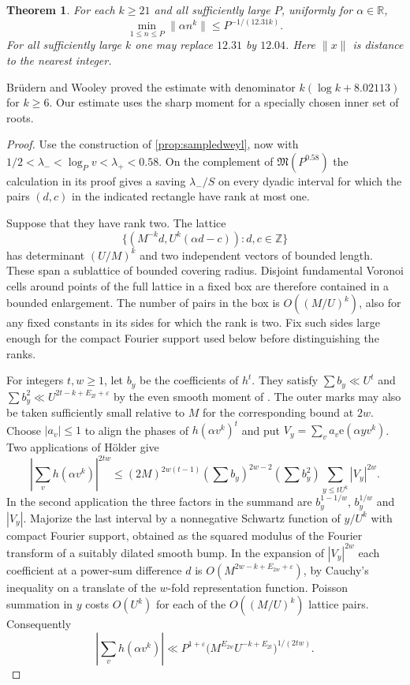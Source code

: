 \documentclass[11pt,letterpaper]{article}
\newtheorem{theorem}{Theorem}[section]
\theoremstyle{definition}
\newcommand{\Z}{\mathbb Z}
\newcommand{\R}{\mathbb R}
\newcommand{\M}{\mathfrak M}
\newcommand{\e}{\mathrm e}
\newcommand{\eps}{\varepsilon}
\begin{document}
\begin{theorem}\label{thm:fractional}
For each $k\ge21$ and all sufficiently large $P$, uniformly for
$\alpha\in\R$,
\[
        \min_{1\le n\le P}\|\alpha n^k\|\le P^{-1/(12.31k)} .
\]
For all sufficiently large $k$ one may replace $12.31$ by $12.04$.
Here $\|x\|$ is distance to the nearest integer.
\end{theorem}
Br\"udern and Wooley \cite[Theorem 1.2]{BWminor} proved the estimate
with denominator $k(\log k+8.02113)$ for $k\ge6$. Our estimate
uses the sharp moment for a specially chosen inner set of roots.

\begin{proof}
Use the construction of \cref{prop:sampledweyl}, now with
$1/2<\lambda_-<\log_P v<\lambda_+<0.58$. On the complement
of $\M(P^{0.58})$ the calculation in its proof gives a saving
$\lambda_-/S$ on every dyadic interval for which the pairs
$(d,c)$ in the indicated rectangle have rank at most one.

Suppose that they have rank two. The lattice
\[
 \{(M^{-k}d,U^k(\alpha d-c)):d,c\in\Z\}
\]
has determinant $(U/M)^k$ and two independent vectors of bounded length.
These span a sublattice of bounded covering radius. Disjoint fundamental
Voronoi cells around points of the full lattice in a fixed box are
therefore contained in a bounded enlargement. The number of pairs
in the box is $O((M/U)^k)$, also for any fixed constants in its sides
for which the rank is two. Fix such sides large enough for the compact
Fourier support used below before distinguishing the ranks.

For integers $t,w\ge1$, let $b_y$ be the coefficients of $h^t$.
They satisfy $\sum b_y\ll U^t$ and
$\sum b_y^2\ll U^{2t-k+E_{2t}+\eps}$ by the even smooth moment
of \cite[Lemma 2.1]{W95}. The outer marks may also be taken sufficiently
small relative to $M$ for the corresponding bound at $2w$. Choose
$|a_v|\le1$ to align the phases of $h(\alpha v^k)^t$ and put
$V_y=\sum_v a_v\e(\alpha yv^k)$. Two applications of H\"older give
\[
 \left|\sum_v h(\alpha v^k)\right|^{2tw}\!
 \le (2M)^{2w(t-1)}(\textstyle\sum b_y)^{2w-2}
                (\textstyle\sum b_y^2)\sum_{y\le tU^k}|V_y|^{2w}.
\]
In the second application the three factors in the summand are
$b_y^{1-1/w}$, $b_y^{1/w}$ and $|V_y|$. Majorize the last interval
by a nonnegative Schwartz function of $y/U^k$ with compact Fourier
support, obtained as the squared modulus of the Fourier transform
of a suitably dilated smooth bump. In the expansion of $|V_y|^{2w}$
each coefficient at a power-sum difference $d$ is
$O(M^{2w-k+E_{2w}+\eps})$, by Cauchy's inequality on a translate
of the $w$-fold representation function. Poisson summation in $y$
costs $O(U^k)$ for each of the $O((M/U)^k)$ lattice pairs. Consequently
\[
 \left|\sum_v h(\alpha v^k)\right|\ll
 P^{1+\eps}\bigl(M^{E_{2w}}U^{-k+E_{2t}}\bigr)^{1/(2tw)} .
\]


\end{proof}
\end{document}
